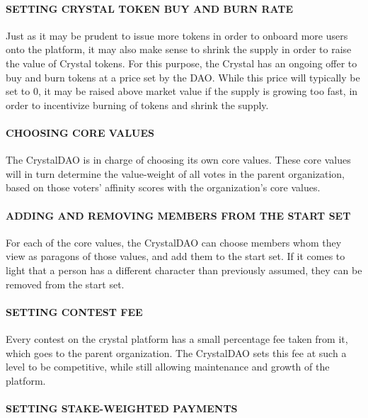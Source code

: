 \paragraph{SETTING CRYSTAL TOKEN BUY AND BURN
RATE}\label{setting-crystal-token-buy-and-burn-rate}

Just as it may be prudent to issue more tokens in order to onboard more
users onto the platform, it may also make sense to shrink the supply in
order to raise the value of Crystal tokens. For this purpose, the
Crystal has an ongoing offer to buy and burn tokens at a price set by
the DAO. While this price will typically be set to 0, it may be raised
above market value if the supply is growing too fast, in order to
incentivize burning of tokens and shrink the supply.

\paragraph{CHOOSING CORE VALUES}\label{choosing-core-values}

The CrystalDAO is in charge of choosing its own core values. These core
values will in turn determine the value-weight of all votes in the
parent organization, based on those voters' affinity scores with the
organization's core values.

\paragraph{ADDING AND REMOVING MEMBERS FROM THE START
SET}\label{adding-and-removing-members-from-the-start-set}

For each of the core values, the CrystalDAO can choose members whom they
view as paragons of those values, and add them to the start set. If it
comes to light that a person has a different character than previously
assumed, they can be removed from the start set.

\paragraph{SETTING CONTEST FEE}\label{setting-contest-fee}

Every contest on the crystal platform has a small percentage fee taken
from it, which goes to the parent organization. The CrystalDAO sets this
fee at such a level to be competitive, while still allowing maintenance
and growth of the platform.

\paragraph{SETTING STAKE-WEIGHTED
PAYMENTS}\label{setting-stake-weighted-payments}

